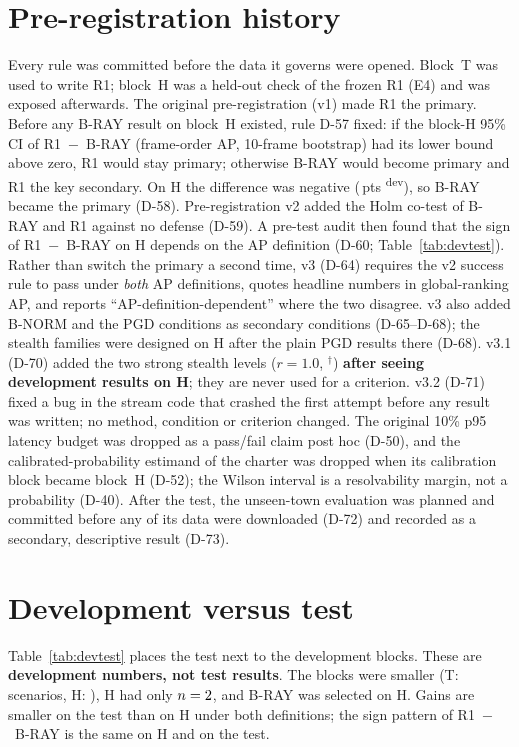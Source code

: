 \documentclass[conference]{IEEEtran}
\newcommand{\pts}{\,pts}
\newcommand{\dev}{\textsuperscript{dev}}
\begin{document}
\appendices

\section{Pre-registration history}
\label{app:prereg}
Every rule was committed before the data it governs were opened. Block~T was used to write R1; block~H was a
held-out check of the frozen R1 (E4) and was exposed afterwards. The original pre-registration (v1) made R1 the
primary. Before any B-RAY result on block~H existed, rule D-57 fixed: if the block-H 95\% CI of R1~$-$~B-RAY
(frame-order AP, 10-frame bootstrap) had its lower bound above zero, R1 would stay primary; otherwise B-RAY would
become primary and R1 the key secondary. On H the difference was negative (\DevHFrameRmB\pts{} \dev), so B-RAY
became the primary (D-58). Pre-registration v2 added the Holm co-test of B-RAY and R1 against no defense (D-59).
A pre-test audit then found that the sign of R1~$-$~B-RAY on H depends on the AP definition (D-60;
Table~\ref{tab:devtest}). Rather than switch the primary a second time, v3 (D-64) requires the v2 success rule to
pass under \emph{both} AP definitions, quotes headline numbers in global-ranking AP, and reports
``AP-definition-dependent'' where the two disagree. v3 also added B-NORM and the PGD conditions as secondary
conditions (D-65--D-68); the stealth families were designed on H after the plain PGD results there (D-68). v3.1
(D-70) added the two strong stealth levels ($r=1.0$, $^\dagger$) \textbf{after seeing development results on H};
they are never used for a criterion. v3.2 (D-71) fixed a bug in the stream code that crashed the first attempt
before any result was written; no method, condition or criterion changed. The original 10\% p95 latency budget
was dropped as a pass/fail claim post hoc (D-50), and the calibrated-probability estimand of the charter was
dropped when its calibration block became block~H (D-52); the Wilson interval is a resolvability margin, not a
probability (D-40). After the test, the unseen-town evaluation was planned and committed before any of its data
were downloaded (D-72) and recorded as a secondary, descriptive result (D-73).

\section{Development versus test}
\label{app:devtest}
Table~\ref{tab:devtest} places the test next to the development blocks. These are \textbf{development numbers,
not test results}. The blocks were smaller (T: \DevTScenarios{} scenarios, H: \DevHScenarios), H had only
$n=2$, and B-RAY was selected on H. Gains are smaller on the test than on H under both definitions; the sign
pattern of R1~$-$~B-RAY is the same on H and on the test.
\end{document}
